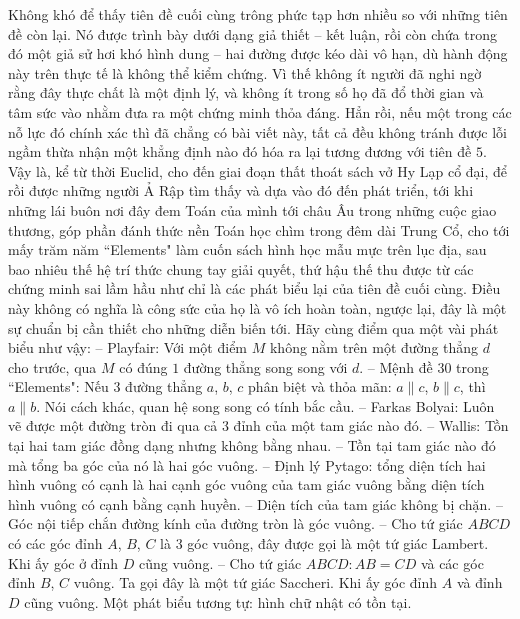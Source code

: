 \begin{multicols}{2}
	Không khó để thấy tiên đề cuối cùng trông phức tạp hơn nhiều so với những tiên đề còn lại. Nó được trình bày dưới dạng giả thiết -- kết luận, rồi còn chứa trong đó một giả sử hơi khó hình dung -- hai đường được kéo dài vô hạn, dù hành động này trên thực tế là không thể kiểm chứng. Vì thế không ít người đã nghi ngờ rằng đây thực chất là một định lý, và không ít trong số họ đã đổ thời gian và tâm sức vào nhằm đưa ra một chứng minh thỏa đáng. Hẳn rồi, nếu một trong các nỗ lực đó chính xác thì đã chẳng có bài viết này, tất cả đều không tránh được lỗi ngầm thừa nhận một khẳng định nào đó hóa ra lại tương đương với tiên đề $5$. Vậy là, kể từ thời Euclid, cho đến giai đoạn thất thoát sách vở Hy Lạp cổ đại, để rồi được những người Ả Rập tìm thấy và dựa vào đó đến phát triển, tới khi những lái buôn nơi đây đem Toán của mình tới châu Âu trong những cuộc giao thương, góp phần đánh thức nền Toán học chìm trong đêm dài Trung Cổ, cho tới mấy trăm năm ``Elements" làm cuốn sách hình học mẫu mực trên lục địa, sau bao nhiêu thế hệ trí thức chung tay giải quyết, thứ hậu thế thu được từ các chứng minh sai lầm hầu như chỉ là các phát biểu lại của tiên đề cuối cùng. 
	\vskip 0.1cm
	Điều này không có nghĩa là công sức của họ là vô ích hoàn toàn, ngược lại, đây là một sự chuẩn bị cần thiết cho những diễn biến tới. Hãy cùng điểm qua một vài phát biểu như vậy: 
	\vskip 0.1cm
	-- Playfair: Với một điểm $M$ không nằm trên một đường thẳng $d$ cho trước, qua $M$ có đúng $1$ đường thẳng song song với $d$. 
	\vskip 0.1cm 
	-- Mệnh đề $30$ trong ``Elements": Nếu $3$ đường thẳng $a$, $b$, $c$ phân biệt và thỏa mãn: $a \parallel c$, $b \parallel c$, thì $a \parallel b$. Nói cách khác, quan hệ song song có tính bắc cầu.
	\vskip 0.1cm
	-- Farkas Bolyai: Luôn vẽ được một đường tròn đi qua cả $3$ đỉnh của một tam giác nào đó.
	\vskip 0.1cm
	-- Wallis: Tồn tại hai tam giác đồng dạng nhưng không bằng nhau.
	\vskip 0.1cm
	-- Tồn tại tam giác nào đó mà tổng ba góc của nó là hai góc vuông.
	\vskip 0.1cm
	-- Định lý Pytago: tổng diện tích hai hình vuông có cạnh là hai cạnh góc vuông của tam giác vuông bằng diện tích hình vuông có cạnh bằng cạnh huyền.
	\vskip 0.1cm
	-- Diện tích của tam giác không bị chặn.
	\vskip 0.1cm
	-- Góc nội tiếp chắn đường kính của đường tròn là góc vuông.
	\vskip 0.1cm
	-- Cho tứ giác $ABCD$ có các góc đỉnh $A$, $B$, $C$ là $3$ góc vuông, đây được gọi là một tứ giác Lambert. Khi ấy góc ở đỉnh $D$ cũng vuông.
	\vskip 0.1cm
	-- Cho tứ giác $ABCD: AB = CD$ và các góc đỉnh $B$, $C$ vuông. Ta gọi đây là một tứ giác Saccheri. Khi ấy góc đỉnh $A$ và đỉnh $D$ cũng vuông. Một phát biểu tương tự: hình chữ nhật có tồn tại.

\end{multicols}
